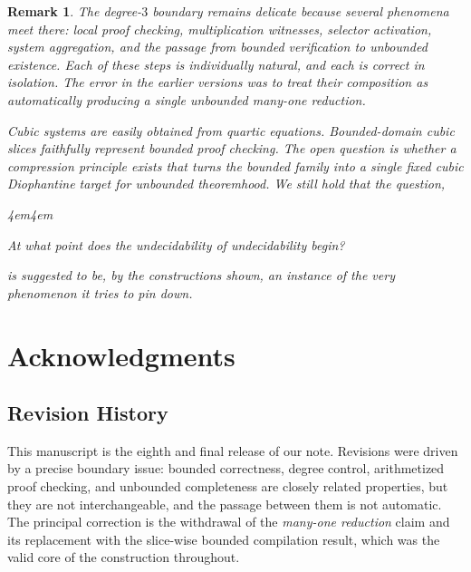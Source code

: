 \documentclass[letterpaper,10pt]{article}
\theoremstyle{upright}
\theoremstyle{upright}
\newtheorem{remark}[theorem]{Remark}
\renewenvironment{quotation}
{\small\vspace{0.5em}\begin{adjustwidth}{4em}{4em}%

		\setlength{\parindent}{0pt}%
		\setlength{\parskip}{\medskipamount}%
	}
	{\end{adjustwidth}\vspace{1em}}
\begin{document}
\begin{remark}
\label{rem:impredicativity-boundary}
	The degree-$3$ boundary remains delicate because several phenomena meet there: local proof checking, multiplication witnesses, selector activation, system aggregation, and the passage from bounded verification to unbounded existence. Each of these steps is individually natural, and each is correct in isolation. The error in the earlier versions was to treat their composition as automatically producing a single unbounded many-one reduction.

	Cubic systems are easily obtained from quartic equations. Bounded-domain cubic slices faithfully represent bounded proof checking. The open question is whether a compression principle exists that turns the bounded family into a single fixed cubic Diophantine target for unbounded theoremhood. We still hold that the question,
	\begin{quotation}
		At what point does the undecidability of undecidability begin?
	\end{quotation}
	is suggested to be, by the constructions shown, an instance of the very phenomenon it tries to pin down.
\end{remark}

\clearpage

\section*{Acknowledgments}
\vspace*{\fill}
{\scriptsize
	
	\setlength{\bibsep}{0.4em}
	}
\vspace*{\fill}

\clearpage

\vspace*{\fill}

\subsection*{Revision History}

	This manuscript is the eighth and final release of our note. Revisions were driven by a precise boundary issue: bounded correctness, degree control, arithmetized proof checking, and unbounded completeness are closely related properties, but they are not interchangeable, and the passage between them is not automatic. The principal correction is the withdrawal of the \emph{many-one reduction} claim and its replacement with the slice-wise bounded compilation result, which was the valid core of the construction throughout.
\end{document}
